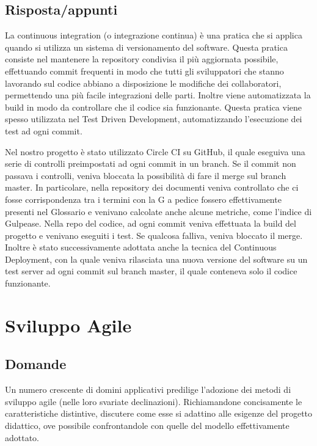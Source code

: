 \subsection*{Risposta/appunti} %
La continuous integration (o integrazione continua) è una pratica che si applica quando si utilizza un sistema di versionamento del software. Questa pratica consiste nel mantenere la repository condivisa il più aggiornata possibile, effettuando commit frequenti in modo che tutti gli sviluppatori che stanno lavorando sul codice abbiano a disposizione le modifiche dei collaboratori, permettendo una più facile integrazioni delle parti. Inoltre viene automatizzata la build in modo da controllare che il codice sia funzionante. Questa pratica viene spesso utilizzata nel Test Driven Development, automatizzando l'esecuzione dei test ad ogni commit.

Nel nostro progetto è stato utilizzato Circle CI su GitHub, il quale eseguiva una serie di controlli preimpostati ad ogni commit in un branch. Se il commit non passava i controlli, veniva bloccata la possibilità di fare il merge sul branch master. In particolare, nella repository dei documenti veniva controllato che ci fosse corrispondenza tra i termini con la G a pedice fossero effettivamente presenti nel Glossario e venivano calcolate anche alcune metriche, come l'indice di Gulpease.
Nella repo del codice, ad ogni commit veniva effettuata la build del progetto e venivano eseguiti i test. Se qualcosa falliva, veniva bloccato il merge.
Inoltre è stato successivamente adottata anche la tecnica del Continuous Deployment, con la quale veniva rilasciata una nuova versione del software su un test server ad ogni commit sul branch master, il quale conteneva solo il codice funzionante.

\section{Sviluppo Agile}

\subsection*{Domande}
Un numero crescente di domini applicativi predilige l'adozione dei metodi di sviluppo agile (nelle loro svariate declinazioni). Richiamandone concisamente le caratteristiche distintive, discutere come esse si adattino alle esigenze del progetto didattico, ove possibile confrontandole con quelle del modello effettivamente adottato.

